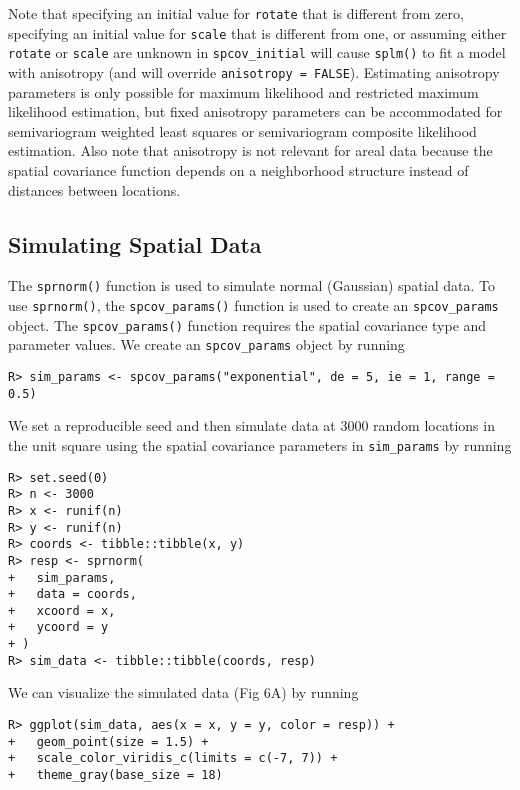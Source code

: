 \documentclass[10pt,letterpaper]{article}
\begin{document}
Note that specifying an initial value for \texttt{rotate} that is
different from zero, specifying an initial value for \texttt{scale} that
is different from one, or assuming either \texttt{rotate} or
\texttt{scale} are unknown in \texttt{spcov\_initial} will cause
\texttt{splm()} to fit a model with anisotropy (and will override
\texttt{anisotropy\ =\ FALSE}). Estimating anisotropy parameters is only
possible for maximum likelihood and restricted maximum likelihood
estimation, but fixed anisotropy parameters can be accommodated for
semivariogram weighted least squares or semivariogram composite
likelihood estimation. Also note that anisotropy is not relevant for
areal data because the spatial covariance function depends on a
neighborhood structure instead of distances between locations.

\hypertarget{sec:sim_data}{%
\subsection{Simulating Spatial Data}\label{sec:sim_data}}

The \texttt{sprnorm()} function is used to simulate normal (Gaussian)
spatial data. To use \texttt{sprnorm()}, the \texttt{spcov\_params()}
function is used to create an \texttt{spcov\_params} object. The
\texttt{spcov\_params()} function requires the spatial covariance type
and parameter values. We create an \texttt{spcov\_params} object by
running

\begin{verbatim}
R> sim_params <- spcov_params("exponential", de = 5, ie = 1, range = 0.5)
\end{verbatim}

We set a reproducible seed and then simulate data at 3000 random
locations in the unit square using the spatial covariance parameters in
\texttt{sim\_params} by running

\begin{verbatim}
R> set.seed(0)
R> n <- 3000
R> x <- runif(n)
R> y <- runif(n)
R> coords <- tibble::tibble(x, y)
R> resp <- sprnorm(
+   sim_params,
+   data = coords,
+   xcoord = x,
+   ycoord = y
+ )
R> sim_data <- tibble::tibble(coords, resp)
\end{verbatim}

\noindent We can visualize the simulated data (Fig 6A) by running

\begin{verbatim}
R> ggplot(sim_data, aes(x = x, y = y, color = resp)) +
+   geom_point(size = 1.5) +
+   scale_color_viridis_c(limits = c(-7, 7)) + 
+   theme_gray(base_size = 18)
\end{verbatim}
\end{document}
